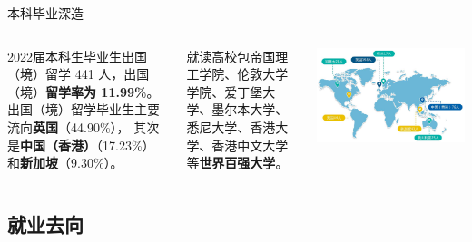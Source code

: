 \documentclass[aspectratio=169, utf8]{beamer}
\begin{document}
\begin{frame}{本科毕业深造}
    \begin{columns}
        \setlength{\parindent}{2em}

        2022届本科生毕业生出国（境）留学 441 人，出国（境）\textcolor{Fore}{\textbf{留学率为 11.99\%}}。
        出国（境）留学毕业生主要流向\textcolor{Fore}{\textbf{英国}}（44.90\%），
        其次是\textcolor{Fore}{\textbf{中国（香港）}}（17.23\%）和\textcolor{Fore}{\textbf{新加坡}}（9.30\%）。

        就读高校包帝国理工学院、伦敦大学学院、爱丁堡大学、墨尔本大学、悉尼大学、香港大学、香港中文大学等\textcolor{Fore}{\textbf{世界百强大学}}。

        \includegraphics[width=\textwidth]{./resources/18.jpg}
    \end{columns}
\end{frame}

\subsection*{就业去向}
\end{document}
